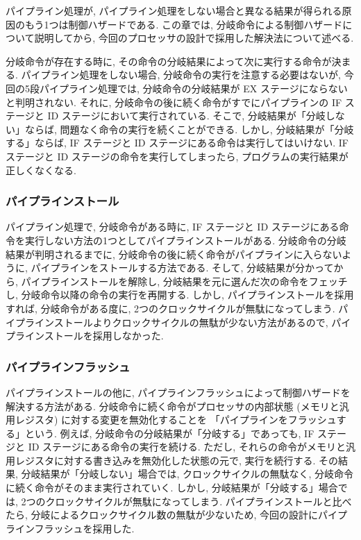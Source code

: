 \documentclass[../specifications.tex]{subfiles}
\begin{document}
  パイプライン処理が, 
  パイプライン処理をしない場合と異なる結果が得られる原因のもう1つは制御ハザードである.
  この章では, 分岐命令による制御ハザードについて説明してから, 
  今回のプロセッサの設計で採用した解決法について述べる.

  分岐命令が存在する時に, その命令の分岐結果によって次に実行する命令が決まる.
  パイプライン処理をしない場合, 分岐命令の実行を注意する必要はないが, 
  今回の5段パイプライン処理では, 分岐命令の分岐結果が EX ステージにならないと判明されない.
  それに, 分岐命令の後に続く命令がすでにパイプラインの IF ステージと ID ステージにおいて実行されている.
  そこで, 分岐結果が「分岐しない」ならば, 問題なく命令の実行を続くことができる.
  しかし, 分岐結果が「分岐する」ならば, IF ステージと ID ステージにある命令は実行してはいけない.
  IF ステージと ID ステージの命令を実行してしまったら, プログラムの実行結果が正しくなくなる.

  \subsubsection{パイプラインストール}
  パイプライン処理で, 分岐命令がある時に, 
  IF ステージと ID ステージにある命令を実行しない方法の1つとしてパイプラインストールがある.
  分岐命令の分岐結果が判明されるまでに, 分岐命令の後に続く命令がパイプラインに入らないように, 
  パイプラインをストールする方法である.
  そして, 分岐結果が分かってから, パイプラインストールを解除し, 
  分岐結果を元に選んだ次の命令をフェッチし, 分岐命令以降の命令の実行を再開する.
  しかし, パイプラインストールを採用すれば, 分岐命令がある度に,
  2つのクロックサイクルが無駄になってしまう.
  パイプラインストールよりクロックサイクルの無駄が少ない方法があるので, 
  パイプラインストールを採用しなかった.

  \subsubsection{パイプラインフラッシュ}
  パイプラインストールの他に, パイプラインフラッシュによって制御ハザードを解決する方法がある.
  分岐命令に続く命令がプロセッサの内部状態 (メモリと汎用レジスタ) に対する変更を無効化することを
  「パイプラインをフラッシュする」という.
  例えば, 分岐命令の分岐結果が「分岐する」であっても, IF ステージと ID ステージにある命令の実行を続ける.
  ただし, それらの命令がメモリと汎用レジスタに対する書き込みを無効化した状態の元で, 実行を続行する.
  その結果, 分岐結果が「分岐しない」場合では, クロックサイクルの無駄なく, 
  分岐命令に続く命令がそのまま実行されていく.
  しかし, 分岐結果が「分岐する」場合では, 2つのクロックサイクルが無駄になってしまう.
  パイプラインストールと比べたら, 分岐によるクロックサイクル数の無駄が少ないため, 
  今回の設計にパイプラインフラッシュを採用した.
\end{document}
